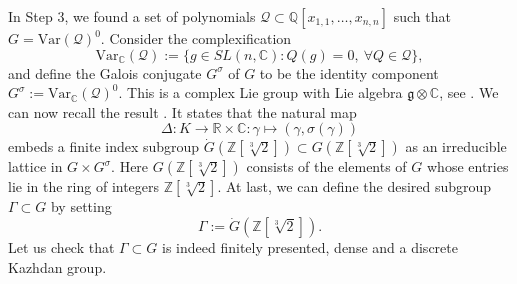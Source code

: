 \documentclass[11pt, letterpaper, oneside,reqno]{amsart}
\theoremstyle{plain}
\theoremstyle{underline}
\theoremstyle{definition}
\theoremstyle{remark}
\begin{document}
	In Step 3, we found a set of polynomials $\mathcal{Q}\subset\mathbb{Q}[x_{1,1},\ldots,x_{n,n}]$ such that $G=\text{Var}(\mathcal{Q})^{0}$. Consider the complexification
	\[
	\text{Var}_{\mathbb{C}}(\mathcal{Q}):=\{g\in SL(n,\mathbb{C}): Q(g)=0,\ \forall Q\in \mathcal{Q}\},
	\]
	and define the Galois conjugate $G^{\sigma}$ of $G$ to be the identity component $G^{\sigma}:=\text{Var}_{\mathbb{C}}(\mathcal{Q})^{0}$. This is a complex Lie group with Lie algebra $\mathfrak{g}\otimes\mathbb{C}$, see \cite[\S~18.1.3 and \S~18.1.8]{Witte}. We can now recall the result \cite[Prop.~5.5.8]{Witte}. It states that the natural map
	\[
	\Delta:K\rightarrow\mathbb{R}\times\mathbb{C}:\gamma\mapsto(\gamma,\sigma(\gamma))
	\]
	embeds a finite index subgroup $\dot{G}(\mathbb{Z}[\sqrt[3]{2}])\subset G(\mathbb{Z}[\sqrt[3]{2}])$ as an irreducible lattice in $G\times G^{\sigma}$. Here $G(\mathbb{Z}[\sqrt[3]{2}])$ consists of the elements of $G$ whose entries lie in the ring of integers $\mathbb{Z}[\sqrt[3]{2}]$. At last, we can define the desired subgroup $\Gamma\subset G$ by setting
	$$
	\Gamma:=\dot{G}(\mathbb{Z}[\sqrt[3]{2}]).
	$$
	Let us check that $\Gamma\subset G$ is indeed finitely presented, dense and a discrete Kazhdan group.
\end{document}
